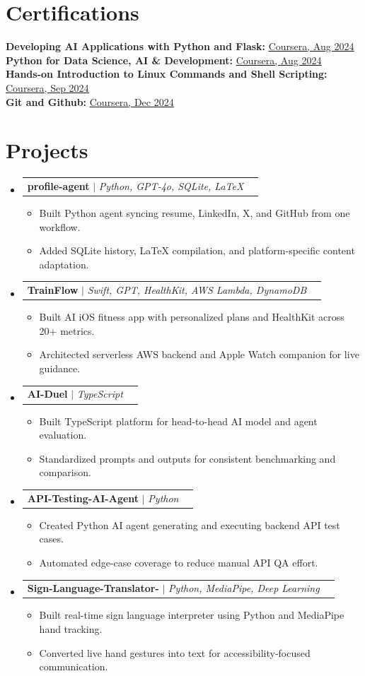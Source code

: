 \documentclass[letterpaper,11pt]{article}
\makeatletter
\newcommand{\resumeItem}[1]{
  \item\small{
    {#1 \vspace{-2pt}}
  }
}
\newcommand{\resumeProjectHeading}[2]{
    \item
    \begin{tabular*}{0.97\textwidth}{l@{\extracolsep{\fill}}r}
      \small#1 & #2 \\
    \end{tabular*}\vspace{-7pt}
}
\newcommand{\resumeSubHeadingListStart}{\begin{itemize}[leftmargin=0.15in, label={}]}
\newcommand{\resumeSubHeadingListEnd}{\end{itemize}}
\newcommand{\resumeItemListStart}{\begin{itemize}}
\newcommand{\resumeItemListEnd}{\end{itemize}\vspace{-5pt}}
\makeatother
\begin{document}
\section{Certifications}
  \begin{itemize}[leftmargin=0.15in, label={}]
    \small{\item{
     \textbf{Developing AI Applications with Python and Flask: }\href{https://coursera.org/verify/VDUXJS41RR9B}{\underline{Coursera, Aug 2024}} \\
     \textbf{Python for Data Science, AI \& Development: }\href{https://coursera.org/verify/NXS6UHQFPM6X}{\underline{Coursera, Aug 2024}} \\
     \textbf{Hands-on Introduction to Linux Commands and Shell Scripting: }\href{https://coursera.org/verify/S9HCS7K4YXKL}{\underline{Coursera, Sep 2024}} \\
     \textbf{Git and Github: }\href{https://coursera.org/verify/H7P1GSQYC1OS}{\underline{Coursera, Dec 2024}}
    }}
  \end{itemize}

\section{Projects}
  \resumeSubHeadingListStart
    \resumeProjectHeading{\textbf{profile-agent} $|$ \emph{Python, GPT-4o, SQLite, LaTeX}}{}
      \resumeItemListStart
        \resumeItem{Built Python agent syncing resume, LinkedIn, X, and GitHub from one workflow.}
        \resumeItem{Added SQLite history, LaTeX compilation, and platform-specific content adaptation.}
      \resumeItemListEnd
    \resumeProjectHeading{\textbf{TrainFlow} $|$ \emph{Swift, GPT, HealthKit, AWS Lambda, DynamoDB}}{}
      \resumeItemListStart
        \resumeItem{Built AI iOS fitness app with personalized plans and HealthKit across 20+ metrics.}
        \resumeItem{Architected serverless AWS backend and Apple Watch companion for live guidance.}
      \resumeItemListEnd
    \resumeProjectHeading{\textbf{AI-Duel} $|$ \emph{TypeScript}}{}
      \resumeItemListStart
        \resumeItem{Built TypeScript platform for head-to-head AI model and agent evaluation.}
        \resumeItem{Standardized prompts and outputs for consistent benchmarking and comparison.}
      \resumeItemListEnd
    \resumeProjectHeading{\textbf{API-Testing-AI-Agent} $|$ \emph{Python}}{}
      \resumeItemListStart
        \resumeItem{Created Python AI agent generating and executing backend API test cases.}
        \resumeItem{Automated edge-case coverage to reduce manual API QA effort.}
      \resumeItemListEnd
    \resumeProjectHeading{\textbf{Sign-Language-Translator-} $|$ \emph{Python, MediaPipe, Deep Learning}}{}
      \resumeItemListStart
        \resumeItem{Built real-time sign language interpreter using Python and MediaPipe hand tracking.}
        \resumeItem{Converted live hand gestures into text for accessibility-focused communication.}
      \resumeItemListEnd
  \resumeSubHeadingListEnd
\end{document}
